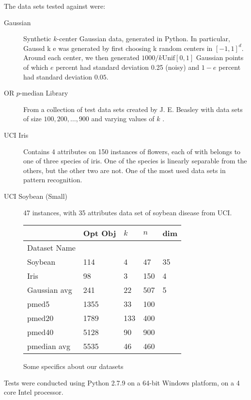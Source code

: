 \documentclass{article}
\begin{document}
The data sets tested against were:
\begin{description}
\item[Gaussian] Synthetic $k$-center Gaussian data, generated in Python. In particular, Gauss\textunderscore d \textunderscore k \textunderscore e was generated by first choosing k random centers in $[-1,1]^d$. Around each center, we then generated $1000/k \mathrm{Unif}[0,1]$ Gaussian points of which $e$ percent had standard deviation 0.25 (noisy) and $1-e$ percent had standard deviation $0.05$. 
\item[OR $p$-median Library] From a collection of test data sets created by J. E. Beasley with data sets of size $100, 200, \ldots, 900$ and varying values of $k$ \cite{Beasley}. 
\item[UCI Iris] \cite{Iris} Contains 4 attributes on 150 instances of flowers, each of with belongs to one of three species of iris.  One of the species is linearly separable from the others, but the other two are not.  One of the most used data sets in pattern recognition.
\item[UCI Soybean (Small)] \cite{Soybean} 47 instances, with 35 attributes data set of soybean disease from UCI.
\end{description} 

\begin{figure}[h]
\begin{tabular}{ | l | l | l | l | l | }
\hline
	  & Opt Obj & $k$ & $n$ & dim \\ \hline
	Dataset Name & \  & \  & \  & \  \\ \hline
	Soybean & 114 & 4 & 47 & 35 \\ 
	Iris & 98 & 3 & 150 & 4 \\ 
	Gaussian avg & 241 & 22 & 507 & 5 \\ 
	pmed5 & 1355 & 33 & 100 & \  \\ 
	pmed20 & 1789 & 133 & 400 & \  \\ 
	pmed40 & 5128 & 90 & 900 & \  \\ 
	pmedian avg & 5535 & 46 & 460 & \  \\ \hline
\end{tabular}

\caption{Some specifics about our datasets}
\end{figure}

Tests were conducted using Python 2.7.9 on a 64-bit Windows platform, on a 4 core Intel processor. 
\end{document}
